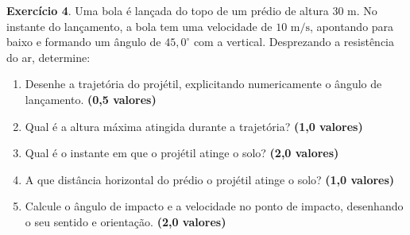 \documentclass[12pt]{article}
\newcommand{\pontos}[1]{\hfill\textbf{(#1 valores)}}
\begin{document}
	\vspace{0.4cm}
	
	\textbf{Exercício 4}. Uma bola é lançada do topo de um prédio de altura $30 \text{ m}$. No instante do lançamento, a bola tem uma velocidade de $10 \text{ m/s}$, apontando para baixo e formando um ângulo de $45,0^\circ$ com a vertical. Desprezando a resistência do ar, determine:
	
	\vspace{0.15cm}
	\begin{enumerate}[label=\textbf{\alph*)}]
		\item Desenhe a trajetória do projétil, explicitando numericamente o ângulo de lançamento. \pontos{0,5}
		\item Qual é a altura máxima atingida durante a trajetória? \pontos{1,0}
		\item Qual é o instante em que o projétil atinge o solo? \pontos{2,0}
		\item A que distância horizontal do prédio o projétil atinge o solo? \pontos{1,0}
		\item Calcule o ângulo de impacto e a velocidade no ponto de impacto, desenhando o seu sentido e orientação. \pontos{2,0}
	\end{enumerate}
	
\end{document}
